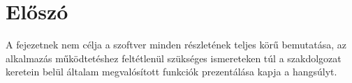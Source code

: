 \section{Előszó}

A fejezetnek nem célja a szoftver minden részletének teljes körű bemutatása, az
alkalmazás működtetéshez feltétlenül szükséges ismereteken túl a szakdolgozat
keretein belül általam megvalósított funkciók prezentálása kapja a hangsúlyt.

